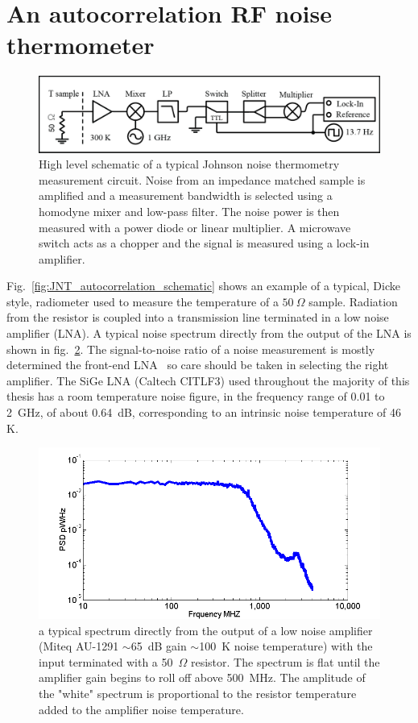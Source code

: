 \section{An autocorrelation RF noise thermometer}
\begin{figure}
\centering
\includegraphics[width=\textwidth]{figures/Johnson_noise_thermometry/Schematic_Autocorrelation.png}
\caption[JNT autocorrelation schematic]{High level schematic of a typical Johnson noise thermometry measurement circuit. Noise from an impedance matched sample is amplified and a measurement bandwidth is selected using a homodyne mixer and low-pass filter. The noise power is then measured with a power diode or linear multiplier. A microwave switch acts as a chopper and the signal is measured using a lock-in amplifier.}
\label{fig:schematic_autocorrelation}
\end{figure}

Fig.~\ref{fig:JNT_autocorrelation_schematic} shows an example of a typical, Dicke style, radiometer used to measure the temperature of a $50~\Omega$ sample. Radiation from the resistor is coupled into a transmission line terminated in a low noise amplifier (LNA). A typical noise spectrum directly from the output of the LNA is shown in fig.~\ref{fig:Miteq_spec}. The signal-to-noise ratio of a noise measurement is mostly determined the front-end LNA~\cite{pozar_microwave_2011} so care should be taken in selecting the right amplifier. The SiGe LNA (Caltech CITLF3) used throughout the majority of this thesis has a room temperature noise figure, in the frequency range of 0.01 to 2~GHz, of about 0.64~dB, corresponding to an intrinsic noise temperature of 46 K.
\begin{figure}
\includegraphics[width=\textwidth]{figures/Johnson_noise_thermometry/Miteq_spec.png}
\caption{a typical spectrum directly from the output of a low noise amplifier (Miteq AU-1291 $\sim$65~dB gain $\sim$100~K noise temperature) with the input terminated with a 50~$\Omega$ resistor. The spectrum is flat until the amplifier gain begins to roll off above 500~MHz. The amplitude of the "white" spectrum is proportional to the resistor temperature added to the amplifier noise temperature.}
\label{fig:Miteq_spec}
\end{figure}

